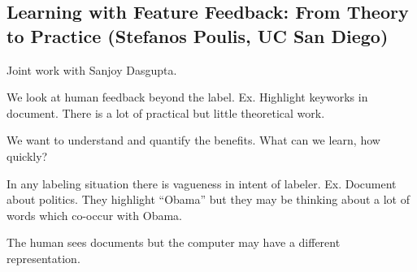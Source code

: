 \subsection{Learning with Feature Feedback: From Theory to Practice (Stefanos Poulis, UC San Diego)}

Joint work with Sanjoy Dasgupta.

We look at human feedback beyond the label. Ex. Highlight keyworks in document.
There is a lot of practical but little theoretical work.

We want to understand and quantify the benefits. What can we learn, how quickly? 

In any labeling situation there is vagueness in intent of labeler.  Ex. Document about politics. They highlight ``Obama'' but they may be thinking about a lot of words which co-occur with Obama.

The human sees documents but the computer may have a different representation.

